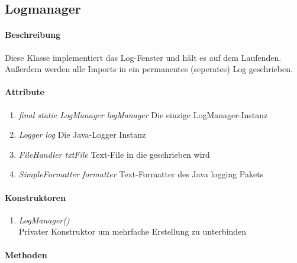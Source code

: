 \subsection{Logmanager}

\paragraph{Beschreibung}
Diese Klasse implementiert das Log-Fenster und hält es auf dem Laufenden.
Außerdem werden alle Imports in ein permanentes (seperates) Log geschrieben.

\paragraph{Attribute}
\begin{enumerate}[$\bullet$]
	\item \textit{final static LogManager logManager}  Die einzige LogManager-Instanz
	\item \textit{Logger log} Die Java-Logger Instanz
	\item \textit{FileHandler txtFile} Text-File in die geschrieben wird
	\item \textit{SimpleFormatter formatter} Text-Formatter des Java logging Pakets
\end{enumerate}

\paragraph{Konstruktoren}
\begin{enumerate}[-]
	\item \textit{LogManager()} \\
	Privater Konstruktor um mehrfache Erstellung zu unterbinden
\end{enumerate}


\paragraph{Methoden}

